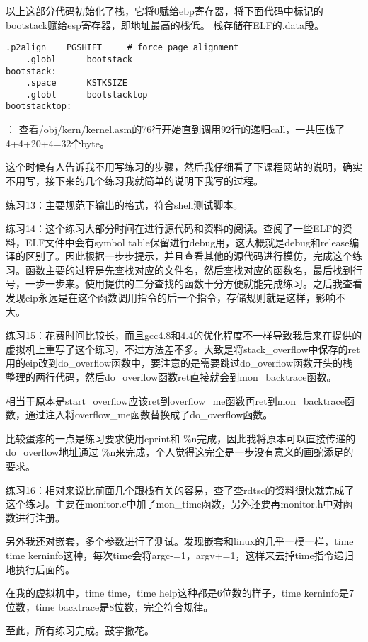 \documentclass[a4paper, 11pt]{ctexart}
\begin{document}
以上这部分代码初始化了栈，它将0赋给ebp寄存器，将下面代码中标记的bootstack赋给esp寄存器，即地址最高的栈低。
栈存储在ELF的.data段。
\begin{lstlisting}[language={[x86masm]Assembler}]
    .p2align    PGSHIFT		# force page alignment
    .globl      bootstack
bootstack:
    .space      KSTKSIZE
    .globl      bootstacktop   
bootstacktop:
\end{lstlisting}

\color{red}{练习12}：\color{black}
查看/obj/kern/kernel.asm的76行开始直到调用92行的递归call，一共压栈了4+4+20+4=32个byte。

这个时候有人告诉我不用写练习的步骤，然后我仔细看了下课程网站的说明，确实不用写，接下来的几个练习我就简单的说明下我写的过程。

\color{red}练习13：\color{black}主要规范下输出的格式，符合shell测试脚本。

\color{red}练习14：\color{black}这个练习大部分时间在进行源代码和资料的阅读。查阅了一些ELF的资料，ELF文件中会有symbol table保留进行debug用，这大概就是debug和release编译的区别了。因此根据一步步提示，并且查看其他的源代码进行模仿，完成这个练习。函数主要的过程是先查找对应的文件名，然后查找对应的函数名，最后找到行号，一步一步来。使用提供的二分查找的函数十分方便就能完成练习。之后我查看发现eip永远是在这个函数调用指令的后一个指令，存储规则就是这样，影响不大。

\color{red}练习15：\color{black}花费时间比较长，而且gcc4.8和4.4的优化程度不一样导致我后来在提供的虚拟机上重写了这个练习，不过方法差不多。大致是将stack\_overflow中保存的ret用的eip改到do\_overflow函数中，要注意的是需要跳过do\_overflow函数开头的栈整理的两行代码，然后do\_overflow函数ret直接就会到mon\_backtrace函数。

相当于原本是start\_overflow应该ret到overflow\_me函数再ret到mon\_backtrace函数，通过注入将overflow\_me函数替换成了do\_overflow函数。

比较蛋疼的一点是练习要求使用cprint和 \%n完成，因此我将原本可以直接传递的do\_overflow地址通过 \%n来完成，个人觉得这完全是一步没有意义的画蛇添足的要求。


\color{red}练习16：\color{black}相对来说比前面几个跟栈有关的容易，查了查rdtsc的资料很快就完成了这个练习。主要在monitor.c中加了mon\_time函数，另外还要再monitor.h中对函数进行注册。

另外我还对嵌套，多个参数进行了测试。发现嵌套和linux的几乎一模一样，time time kerninfo这种，每次time会将argc-=1，argv+=1，这样来去掉time指令递归地执行后面的。

在我的虚拟机中，time time，time help这种都是6位数的样子，time kerninfo是7位数，time backtrace是8位数，完全符合规律。

至此，所有练习完成。鼓掌撒花。

\newpage
\end{document}
